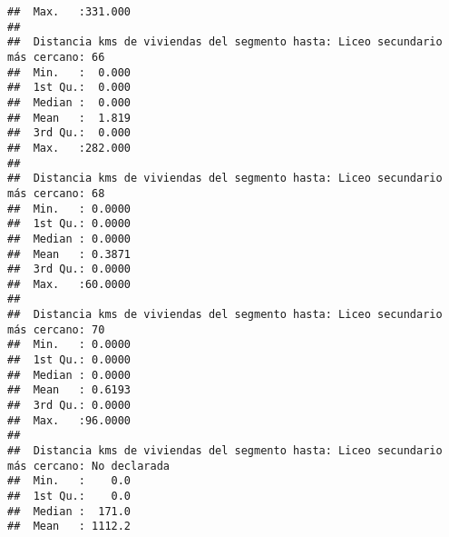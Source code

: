 \documentclass[11pt,]{article}
\begin{document}
\begin{verbatim}
##  Max.   :331.000                                                                
##                                                                                 
##  Distancia kms de viviendas del segmento hasta: Liceo secundario más cercano: 66
##  Min.   :  0.000                                                                
##  1st Qu.:  0.000                                                                
##  Median :  0.000                                                                
##  Mean   :  1.819                                                                
##  3rd Qu.:  0.000                                                                
##  Max.   :282.000                                                                
##                                                                                 
##  Distancia kms de viviendas del segmento hasta: Liceo secundario más cercano: 68
##  Min.   : 0.0000                                                                
##  1st Qu.: 0.0000                                                                
##  Median : 0.0000                                                                
##  Mean   : 0.3871                                                                
##  3rd Qu.: 0.0000                                                                
##  Max.   :60.0000                                                                
##                                                                                 
##  Distancia kms de viviendas del segmento hasta: Liceo secundario más cercano: 70
##  Min.   : 0.0000                                                                
##  1st Qu.: 0.0000                                                                
##  Median : 0.0000                                                                
##  Mean   : 0.6193                                                                
##  3rd Qu.: 0.0000                                                                
##  Max.   :96.0000                                                                
##                                                                                 
##  Distancia kms de viviendas del segmento hasta: Liceo secundario más cercano: No declarada
##  Min.   :    0.0                                                                          
##  1st Qu.:    0.0                                                                          
##  Median :  171.0                                                                          
##  Mean   : 1112.2                                                                          

\end{verbatim}
\end{document}
